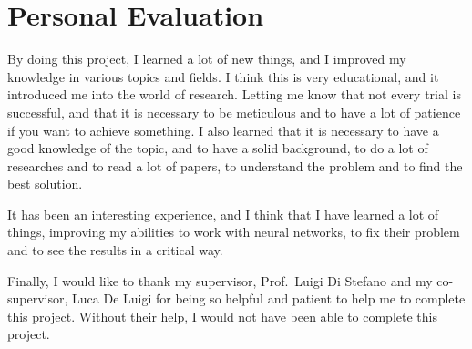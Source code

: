 \section{Personal Evaluation}\label{sec:personal-evaluation}
By doing this project, I learned a lot of new things, and I improved my knowledge in various topics and fields.
I think this is very educational, and it introduced me into the world of research.
Letting me know that not every trial is successful, and that it is necessary to be meticulous and to have a lot of patience if you want to achieve something.
I also learned that it is necessary to have a good knowledge of the topic, and to have a solid background, to do a lot of researches and to read a lot of papers, to understand the problem and to find the best solution.

It has been an interesting experience, and I think that I have learned a lot of things, improving my abilities to work with neural networks, to fix their problem and to see the results in a critical way.

Finally, I would like to thank my supervisor, Prof.~Luigi Di Stefano and my co-supervisor, Luca De Luigi for being so helpful and patient to help me to complete this project.
Without their help, I would not have been able to complete this project.